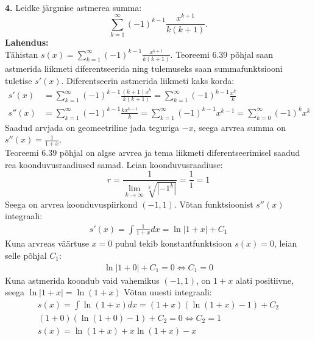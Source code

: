 \documentclass{article}
\begin{document}
\pagebreak\\
\textbf{4.} Leidke j\"argmise astmerea summa:
\begin{equation*}
\sum_{k=1}^\infty(-1)^{k-1}\frac{x^{k+1}}{k(k+1)}.
\end{equation*}
\textbf{Lahendus:}\\
T\"ahistan $s(x)=\sum_{k=1}^\infty(-1)^{k-1}\frac{x^{k+1}}{k(k+1)}$. Teoreemi 6.39 p\~ohjal saan astmerida liikmeti diferentseerida ning tulemuseks saan summafunktsiooni tuletise $s'(x)$. Diferentseerin astmerida liikmeti kaks korda:
\begin{equation*}
\begin{aligned}
s'(x)&=\sum_{k=1}^\infty(-1)^{k-1}\frac{(k+1)x^{k}}{k(k+1)}=\sum_{k=1}^\infty(-1)^{k-1}\frac{x^{k}}{k}\\
s''(x)&=\sum_{k=1}^\infty(-1)^{k-1}\frac{kx^{k-1}}{k}=\sum_{k=1}^\infty(-1)^{k-1}x^{k-1}=\sum_{k=0}^\infty(-1)^{k}x^{k}
\end{aligned}
\end{equation*}
Saadud arvjada on geomeetriline jada teguriga $-x$, seega arvrea summa on $s''(x)=\frac{1}{1+x}$.\\
Teoreemi 6.39 p\~ohjal on algse arvrea ja tema liikmeti diferentseerimisel saadud rea koonduvusraadiused samad. Leian koonduvusraadiuse:
\begin{equation*}
r=\frac{1}{\lim_{k\to\infty}\sqrt[k]{|-1^k|}}=\frac{1}{1}=1
\end{equation*}
Seega on arvrea koonduvuspiirkond $(-1,1)$. V\~otan funktsioonist $s''(x)$ integraali:
\begin{equation*}
\begin{aligned}
s'(x)=\int\frac{1}{1+x}dx=\ln|1+x|+C_1
\end{aligned}
\end{equation*}
Kuna arvreas v\"a\"artuse $x=0$ puhul tekib konstantfunktsioon $s(x)=0$, leian selle p\~ohjal $C_1$:
\begin{equation*}
\begin{aligned}
\ln|1+0|+C_1=0\Leftrightarrow C_1=0
\end{aligned}
\end{equation*}
Kuna astmerida koondub vaid vahemikus $(-1,1)$, on $1+x$ alati positiivne, seega $\ln|1+x|=\ln(1+x)$
V\~otan uuesti integraali:
\begin{equation*}
\begin{aligned}
s(x)=\int\ln(1+x)dx=(1+x)(\ln(1+x)-1)+C_2\\
(1+0)(\ln(1+0)-1)+C_2=0\Leftrightarrow C_2=1\\
s(x)=\ln(1+x)+x\ln(1+x)-x\\
\end{aligned}
\end{equation*}
\end{document}
